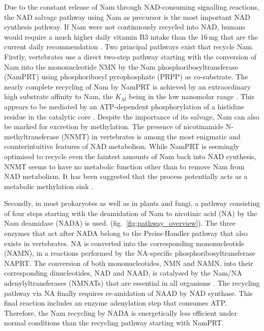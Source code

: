 Due to the constant release of Nam through NAD-consuming signalling reactions, the NAD salvage pathway using Nam as precursor is the most important NAD synthesis pathway. If Nam were not continuously recycled into NAD, humans would require a much higher daily vitamin B3 intake than the 16\,mg that are the current daily recommendation \citep{CommissionofEuropeanCommunities2008}. Two principal pathways exist that recycle Nam. Firstly, vertebrates use a direct two-step pathway starting with the conversion of Nam into the mononucleotide NMN by the Nam phosphoribosyltransferase (NamPRT) using phosphoribosyl pyrophosphate (PRPP) as co-substrate. The nearly complete recycling of Nam by NamPRT is achieved by an extraordinary high substrate affinity to Nam, the $K_{M}$ being in the low nanomolar range \citep{Burgos2008}. This appears to be mediated by an ATP-dependent phosphorylation of a histidine residue in the catalytic core \citep{Burgos2009}. Despite the importance of its salvage, Nam can also be marked for excretion by methylation. The presence of nicotinamide N-methyltransferase (NNMT) in vertebrates \citep{Gossmann2012FEBS} is among the most enigmatic and counterintuitive features of NAD metabolism. While NamPRT is seemingly optimised to recycle even the faintest amounts of Nam back into NAD synthesis, NNMT seems to have no metabolic function other than to remove Nam from NAD metabolism. It has been suggested that the process potentially acts as a metabolic methylation sink \citep{Pissios2017}.

Secondly, in most prokaryotes as well as in plants and fungi, a pathway consisting of four steps starting with the deamidation of Nam to nicotinic acid (NA) by the Nam deamidase (NADA) is used. (fig.~\ref{fig:pathway_overview}). The three enzymes that act after NADA belong to the Preiss-Handler pathway that also exists in vertebrates. NA is converted into the corresponding mononucleotide (NAMN), in a reactions performed by the NA-specific phosphoribosyltransferase NAPRT. The conversion of both mononucleotides, NMN and NAMN, into their corresponding dinucleotides, NAD and NAAD, is catalysed by the Nam/NA adenylyltransferases (NMNATs) that are essential in all organisms \citep{DeFigueiredo2011}. The recycling pathway via NA finally requires re-amidation of NAAD by NAD synthase. This final reaction includes an enzyme adenylation step that consumes ATP. Therefore, the Nam recycling by NADA is energetically less efficient under normal conditions than the recycling pathway starting with NamPRT.

